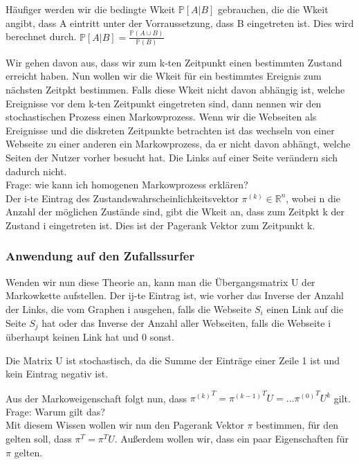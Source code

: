 \documentclass[]{article}
\begin{document}
Häufiger werden wir die bedingte Wkeit $\mathbb{P}[A|B]$ gebrauchen, die die Wkeit angibt, dass A eintritt unter der Vorraussetzung, dass B eingetreten ist. Dies wird berechnet durch. $\mathbb{P}[A|B]= \frac{\mathbb{P}(A \cup B)}{\mathbb{P}(B)}$

Wir gehen davon aus, dass wir zum k-ten Zeitpunkt einen bestimmten Zustand erreicht haben. Nun wollen wir die Wkeit für ein bestimmtes Ereignis zum nächsten Zeitpkt bestimmen. Falls diese Wkeit nicht davon abhängig ist, welche Ereignisse vor dem k-ten Zeitpunkt eingetreten sind, dann nennen wir den stochastischen Prozess einen Markowprozess. Wenn wir die Webseiten als Ereignisse und die diskreten Zeitpunkte betrachten ist das wechseln von einer Webseite zu einer anderen ein Markowprozess, da er nicht davon abhängt, welche Seiten der Nutzer vorher besucht hat. Die Links auf einer Seite verändern sich dadurch nicht. \\

Frage: wie kann ich homogenen Markowprozess erklären? \\

Der i-te Eintrag des Zustandswahrscheinlichkeitsvektor $\pi^{(k)} \in \mathbb{R}^n$, wobei n die Anzahl der möglichen Zustände sind, gibt die Wkeit an, dass zum Zeitpkt k der Zustand i eingetreten ist.  Dies ist der Pagerank Vektor zum Zeitpunkt k. 

\subsubsection{Anwendung auf den Zufallssurfer}
Wenden wir nun diese Theorie an, kann man die Übergangsmatrix U der Markowkette aufstellen. Der ij-te Eintrag ist, wie vorher das Inverse der Anzahl der Links, die vom Graphen i ausgehen, falls die Webseite $S_i$ einen Link auf die Seite $S_j$ hat oder das Inverse der Anzahl aller Webseiten, falls die Webseite i überhaupt keinen Link hat und 0 sonst. 

Die Matrix U ist stochastisch, da die Summe der Einträge einer Zeile 1 ist und kein Eintrag negativ ist. 

Aus der Markoweigenschaft folgt nun, dass ${\pi^{(k)}}^T= {\pi^{(k-1)}}^T U = \dots {\pi^{(0)}}^T U^k$ gilt. \\

Frage: Warum gilt das? \\

Mit diesem Wissen wollen wir nun den Pagerank Vektor $\pi$ bestimmen, für den gelten soll, dass $\pi^T = \pi^T U$. Außerdem wollen wir, dass ein paar Eigenschaften für $\pi$ gelten. 
\end{document}
